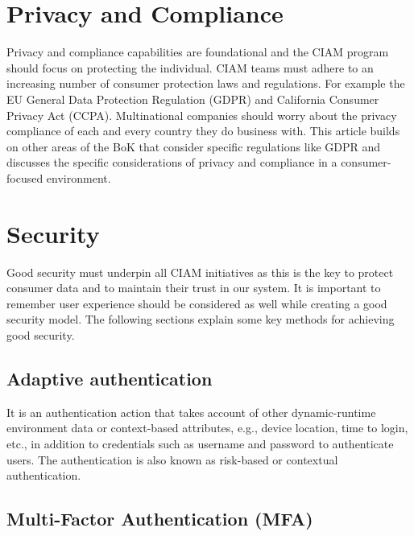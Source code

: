 \hypertarget{privacy-and-compliance}{%
\section{Privacy and Compliance}\label{privacy-and-compliance}}

Privacy and compliance capabilities are foundational and the CIAM
program should focus on protecting the individual. CIAM teams must
adhere to an increasing number of consumer protection laws and
regulations. For example the EU General Data Protection Regulation
(GDPR) and California Consumer Privacy Act (CCPA). Multinational
companies should worry about the privacy compliance of each and every
country they do business with. This article builds on other areas of the
BoK that consider specific regulations like GDPR and discusses the
specific considerations of privacy and compliance in a consumer-focused
environment.

\hypertarget{security}{%
\section{Security}\label{security}}

Good security must underpin all CIAM initiatives as this is the key to
protect consumer data and to maintain their trust in our system. It is
important to remember user experience should be considered as well while
creating a good security model. The following sections explain some key
methods for achieving good security.

\hypertarget{adaptive-authentication}{%
\subsection{Adaptive authentication}\label{adaptive-authentication}}

It is an authentication action that takes account of other
dynamic-runtime environment data or context-based attributes, e.g.,
device location, time to login, etc., in addition to credentials such as
username and password to authenticate users. The authentication is also
known as risk-based or contextual authentication.

\hypertarget{multi-factor-authentication-mfa}{%
\subsection{Multi-Factor Authentication
(MFA)}\label{multi-factor-authentication-mfa}}

